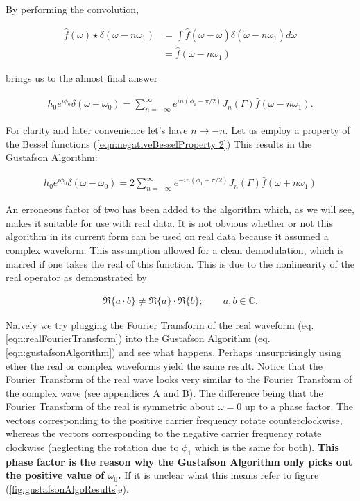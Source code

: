\documentclass[onecolumn, groupedaddress, 10pt]{revtex4-1}
\begin{document}
By performing the convolution,

\begin{align}
\hat{f}(\omega) \star \delta (\omega - n\omega_1) 
&= \int \hat{f}(\omega - \widetilde{\omega}) \delta(\widetilde{\omega} - n\omega_1) d\widetilde{\omega}			\\
&= \hat{f} (\omega - n\omega_1)
\end{align}

brings us to the almost final answer

\begin{align}
h_0 e^{i\phi_0} \delta (\omega - \omega_0) = \sum_{n=-\infty}^{\infty} e^{in(\phi_1-\pi/2)} J_n(\Gamma) \hat{f} (\omega - n\omega_1).
\end{align}

For clarity and later convenience let's have $n\to -n$.  Let us employ a property of the Bessel functions (\ref{eqn:negativeBesselProperty 2}) This results in the Gustafson Algorithm:

\begin{align}
\label{eqn:gustafsonAlgorithm}
\boxed{h_0 e^{i\phi_0} \delta (\omega - \omega_0) = 2 \sum_{n=-\infty}^{\infty} e^{-in(\phi_1+\pi/2)} J_n(\Gamma) \hat{f} (\omega + n\omega_1)}
\end{align}

An erroneous factor of two has been added to the algorithm which, as we will see, makes it suitable for use with real data.  It is not obvious whether or not this algorithm in its current form can be used on real data because it assumed a complex waveform.  This assumption allowed for a clean demodulation, which is marred if one takes the real of this function.  This is due to the nonlinearity of the real operator as demonstrated by

\begin{align}
\Re \{ a \cdot b \} \neq \Re \{ a \} \cdot \Re \{ b \}; \qquad a,b \in \mathds{C}.
\end{align}

Naively we try plugging the Fourier Transform of the real waveform (eq. \ref{eqn:realFourierTransform}) into the Gustafson Algorithm (eq. \ref{eqn:gustafsonAlgorithm}) and see what happens.  Perhaps unsurprisingly using ether the real or complex waveforms yield the same result.  Notice that the Fourier Transform of the real wave looks very similar to the Fourier Transform of the complex wave (see appendices A and B).  The difference being that the Fourier Transform of the real is symmetric about $\omega=0$ up to a phase factor.  The vectors corresponding to the positive carrier frequency rotate counterclockwise, whereas the vectors corresponding to the negative carrier frequency rotate clockwise (neglecting the rotation due to $\phi_1$ which is the same for both).  \textbf{This phase factor is the reason why the Gustafson Algorithm only picks out the positive value of $\omega_0$.}  If it is unclear what this means refer to figure (\ref{fig:gustafsonAlgoResults}e).  
\end{document}
